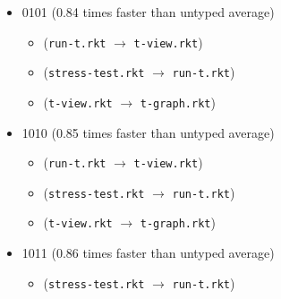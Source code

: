 \documentclass{article}
\newcommand{\mono}[1]{\texttt{#1}}
\begin{document}
\begin{itemize}
\begin{itemize}
  \end{itemize}
\item 0101 (0.84 times faster than untyped average)
  \begin{itemize}
  \item (\mono{run-t.rkt} $\rightarrow$ \mono{t-view.rkt})
  \item (\mono{stress-test.rkt} $\rightarrow$ \mono{run-t.rkt})
  \item (\mono{t-view.rkt} $\rightarrow$ \mono{t-graph.rkt})
  \end{itemize}
\item 1010 (0.85 times faster than untyped average)
  \begin{itemize}
  \item (\mono{run-t.rkt} $\rightarrow$ \mono{t-view.rkt})
  \item (\mono{stress-test.rkt} $\rightarrow$ \mono{run-t.rkt})
  \item (\mono{t-view.rkt} $\rightarrow$ \mono{t-graph.rkt})
  \end{itemize}
\item 1011 (0.86 times faster than untyped average)
  \begin{itemize}
  \item (\mono{stress-test.rkt} $\rightarrow$ \mono{run-t.rkt})
  \end{itemize}


\end{itemize}
\end{document}
